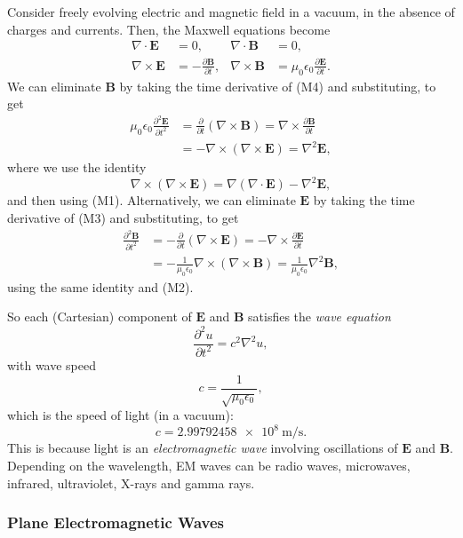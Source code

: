 \documentclass[12pt]{article}
\begin{document}
Consider freely evolving electric and magnetic field in a vacuum, in the absence of charges and currents. Then, the Maxwell equations become
\begin{align*}
	\nabla \cdot \mathbf{E} &= 0, & \nabla \cdot \mathbf{B} &= 0, \\
	\nabla \times \mathbf{E} &= - \frac{\partial \mathbf{B}}{\partial t}, & \nabla \times \mathbf{B} &= \mu_0 \epsilon_0 \frac{\partial \mathbf{E}}{\partial t}.
\end{align*}
We can eliminate $\mathbf{B}$ by taking the time derivative of (M4) and substituting, to get
\begin{align*}
	\mu_0 \epsilon_0 \frac{\partial^2 \mathbf{E}}{\partial t^2} &= \frac{\partial}{\partial t} (\nabla \times \mathbf{B}) = \nabla \times \frac{\partial \mathbf{B}}{\partial t} \\
								    &= - \nabla \times (\nabla \times \mathbf{E}) = \nabla^2 \mathbf{E},
\end{align*}
where we use the identity
\[
\nabla \times(\nabla \times \mathbf{E}) = \nabla (\nabla \cdot \mathbf{E}) - \nabla^2 \mathbf{E},
\]
and then using (M1). Alternatively, we can eliminate $\mathbf{E}$ by taking the time derivative of (M3) and substituting, to get
\begin{align*}
	\frac{\partial^2 \mathbf{B}}{\partial t^2} &= - \frac{\partial}{\partial t} (\nabla \times \mathbf{E}) = - \nabla \times \frac{\partial \mathbf{E}}{\partial t} \\
						   &= - \frac{1}{\mu_0 \epsilon_0} \nabla \times(\nabla \times \mathbf{B}) = \frac{1}{\mu_0 \epsilon_0} \nabla^2 \mathbf{B},
\end{align*}
using the same identity and (M2).

So each (Cartesian) component of $\mathbf{E}$ and $\mathbf{B}$ satisfies the \emph{wave equation}
\[
\frac{\partial^2 u}{\partial t^2} = c^2 \nabla^2 u,
\]
with wave speed
\[
	c = \frac{1}{\sqrt{\mu_0 \epsilon_0}},
\]
which is the speed of light (in a vacuum):
\[
	c = \qty{2.99792458e8}{\meter \per \second}.
\]
This is because light is an \emph{electromagnetic wave} involving oscillations of $\mathbf{E}$ and $\mathbf{B}$. Depending on the wavelength, EM waves can be radio waves, microwaves, infrared, ultraviolet, X-rays and gamma rays.

\subsubsection{Plane Electromagnetic Waves}
\label{subsub:plane_electromagnetic_waves}
\end{document}
